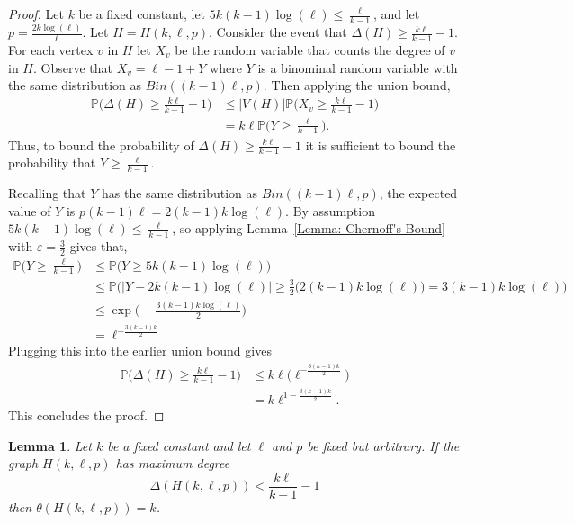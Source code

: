 \documentclass[12pt]{amsart}
\newtheorem{lemma}[theorem]{Lemma}
\theoremstyle{definition}
\def\epsilon{\varepsilon}
\begin{document}
\begin{proof}
    Let $k$ be a fixed constant, let  $5k(k-1)\log(\ell)  \leq \frac{\ell}{k-1}$, and let $p = \frac{2k\log(\ell)}{\ell}$.
    Let $H = H(k,\ell,p)$.
    Consider the event that $\Delta(H) \geq \frac{k\ell}{k-1}  - 1$.
    For each vertex $v$ in $H$ let $X_v$ be the random variable that counts the degree of $v$ in $H$.
    Observe that $X_v = \ell - 1 + Y$ where $Y$ is a binominal random variable with the same distribution as $Bin((k-1)\ell,p)$.
    Then applying the union bound,
    \begin{align*}
        \mathbb{P}\Bigg(\Delta(H) \geq \frac{k\ell}{k-1}  - 1 \Bigg) & \leq |V(H)| \mathbb{P}\Bigg(X_v \geq \frac{k\ell}{k-1}  - 1\Bigg)\\
        & = k\ell \mathbb{P}\Bigg(Y \geq \frac{\ell}{k-1}\Bigg).
    \end{align*}
    Thus, to bound the probability of $\Delta(H) \geq \frac{k\ell}{k-1}  - 1$ it is sufficient to bound the probability that $Y \geq \frac{\ell}{k-1}$.

    Recalling that $Y$ has the same distribution as $Bin((k-1)\ell,p)$,
    the expected value of $Y$ is $p(k-1)\ell = 2(k-1)k\log(\ell)$.
    By assumption $5k(k-1)\log(\ell) \leq \frac{\ell}{k-1}$, so
    applying Lemma~\ref{Lemma: Chernoff's Bound} with $\epsilon = \frac{3}{2}$ gives that,
    \begin{align*}
        \mathbb{P}\Bigg(Y\geq \frac{\ell}{k-1} \Bigg)
        & \leq  \mathbb{P}\Big(Y\geq 5k(k-1)\log(\ell) \Big) \\
        & \leq \mathbb{P}\Bigg(|Y - 2k(k-1)\log(\ell) | \geq \frac{3}{2} \Big(2(k-1)k\log(\ell) \Big) = 3(k-1)k\log(\ell) \Bigg) \\
        & \leq \exp\Bigg(-\frac{3(k-1)k\log(\ell)}{2}\Bigg) \\
        & = \ell^{-\frac{3(k-1)k}{2}}
    \end{align*}
    Plugging this into the earlier union bound gives 
    \begin{align*}
        \mathbb{P}\Bigg(\Delta(H) \geq \frac{k\ell}{k-1}  - 1 \Bigg) & \leq k\ell \Big( \ell^{-\frac{3(k-1)k}{2}}\Big) \\
        & = k\ell^{1-\frac{3(k-1)k}{2}}.
    \end{align*}
    This concludes the proof.
\end{proof}


\begin{lemma}\label{Lemma: Clique = k in H}
    Let $k$ be a fixed constant and let $\ell$ and $p$ be fixed but arbitrary.
    If the graph $H(k,\ell,p)$ has maximum degree 
    \[
    \Delta(H(k,\ell,p)) < \frac{k\ell}{k-1} - 1
    \]
    then $\theta(H(k,\ell,p)) = k$.
\end{lemma}
\end{document}
